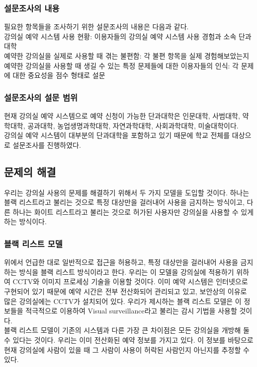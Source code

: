 \documentclass[11pt,a4paper]{article}
\begin{document}
\subsubsection{설문조사의 내용}
필요한 항목들을 조사하기 위한 설문조사의 내용은 다음과 같다.\\
강의실 예약 시스템 사용 현황: 이용자들의 강의실 예약 시스템 사용 경험과 소속 단과대학\\
예약한 강의실을 실제로 사용할 때 겪는 불편함: 각 불편 항목을 실제 경험해보았는지\\
예약한 강의실을 사용할 때 생길 수 있는 특정 문제들에 대한 이용자들의 인식: 각 문제에 대한 중요성을 점수 형태로 설문

\subsubsection{설문조사의 설문 범위}
현재 강의실 예약 시스템으로 예약 신청이 가능한 단과대학은 인문대학, 사범대학, 약학대학, 공과대학, 농업생명과학대학, 자연과학대학, 사회과학대학, 미술대학이다.\\
강의실 예약 시스템이 대부분의 단과대학을 포함하고 있기 때문에 학교 전체를 대상으로 설문조사를 진행하였다.

\subsection{문제의 해결}
우리는 강의실 사용의 문제를 해결하기 위해서 두 가지 모델을 도입할 것이다. 하나는 블랙 리스트라고 불리는 것으로 특정 대상만을 걸러내어 사용을 금지하는 방식이고, 다른 하나는 화이트 리스트라고 불리는 것으로 허가된 사용자만 강의실을 사용할 수 있게 하는 방식이다.

\subsubsection{블랙 리스트 모델}
위에서 언급한 대로 일반적으로 접근을 허용하고, 특정 대상만을 걸러내어 사용을 금지하는 방식을 블랙 리스트 방식이라고 한다. 우리는 이 모델을 강의실에 적용하기 위하여 CCTV와 이미지 프로세싱 기술을 이용할 것이다. 이미 예약 시스템은 인터넷으로 구현되어 있기 때문에 예약 시간은 전부 전산화되어 관리되고 있고, 보안상의 이유로 많은 강의실에는 CCTV가 설치되어 있다. 우리가 제시하는 블랙 리스트 모델은 이 정보들을 적극적으로 이용하여 Visual surveillance라고 불리는 감시 기법을 사용할 것이다.\\
블랙 리스트 모델이 기존의 시스템과 다른 가장 큰 차이점은 모든 강의실을 개방해 둘 수 있다는 것이다. 우리는 이미 전산화된 예약 정보를 가지고 있다. 이 정보를 바탕으로 현재 강의실에 사람이 있을 때 그 사람이 사용이 허락된 사람인지 아닌지를 추정할 수 있다.
\end{document}

